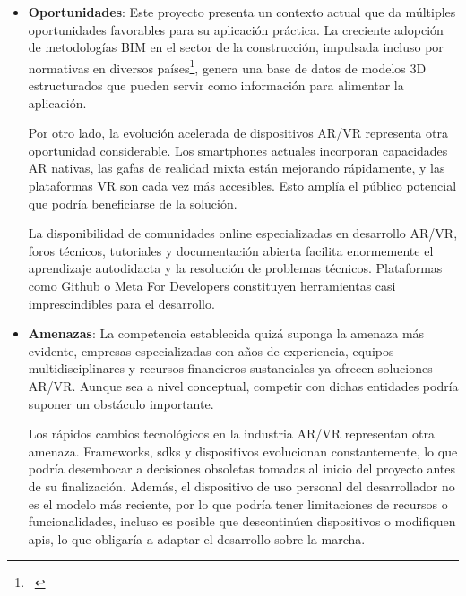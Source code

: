 \begin{itemize}
Después estarían las obligaciones académicas simultáneas, al estar cursando el último año de Ingeniería Multimedia a tiempo completo, esto restará tiempo que se podría invertir en este proyecto, ralentizando el progreso y dificultando el mantener la concentración en aspectos complejos del proyecto.

Finalmente, la limitación de alcance inherente a un TFG impide desarrollar un producto completamente funcional y comercializable. El tiempo disponible obligará a priorizar funcionalidades imprescindibles y a implementar prototipos o demostraciones de concepto en lugar de sistemas robustos listos para producción y venta, afectando la viabilidad real de esta aplicación.

\item \textbf{Oportunidades}: Este proyecto presenta un contexto actual que da múltiples oportunidades favorables para su aplicación práctica. La creciente adopción de metodologías BIM en el sector de la construcción, impulsada incluso por normativas en diversos países\footnote{~\cite{ukcabinet2016strategy, eubim2017handbook, fomento2015comision}}, genera una base de datos de modelos 3D estructurados que pueden servir como información para alimentar la aplicación.

Por otro lado, la evolución acelerada de dispositivos AR/VR representa otra oportunidad considerable. Los smartphones actuales incorporan capacidades AR nativas, las gafas de realidad mixta están mejorando rápidamente, y las plataformas VR son cada vez más accesibles. Esto amplía el público potencial que podría beneficiarse de la solución.

La disponibilidad de comunidades online especializadas en desarrollo AR/VR, foros técnicos, tutoriales y documentación abierta facilita enormemente el aprendizaje autodidacta y la resolución de problemas técnicos. Plataformas como Github o Meta For Developers constituyen herramientas casi imprescindibles para el desarrollo.

\item \textbf{Amenazas}: La competencia establecida quizá suponga la amenaza más evidente, empresas especializadas con años de experiencia, equipos multidisciplinares y recursos financieros sustanciales ya ofrecen soluciones AR/VR. Aunque sea a nivel conceptual, competir con dichas entidades podría suponer un obstáculo importante.

Los rápidos cambios tecnológicos en la industria AR/VR representan otra amenaza. Frameworks, \gls{sdks} y dispositivos evolucionan constantemente, lo que podría desembocar a decisiones obsoletas tomadas al inicio del proyecto antes de su finalización. Además, el dispositivo de uso personal del desarrollador no es el modelo más reciente, por lo que podría tener limitaciones de recursos o funcionalidades, incluso es posible que descontinúen dispositivos o modifiquen \gls{apis}, lo que obligaría a adaptar el desarrollo sobre la marcha.


\end{itemize}
